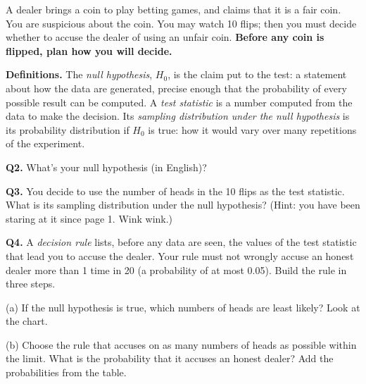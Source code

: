 \documentclass[11pt]{article}
\newif\ifsolutions
\newcommand{\answerbox}[2][2.2cm]{%
  \par\smallskip\noindent
  \begin{tcolorbox}[colback=white, colframe=gray!55, boxrule=0.4pt, sharp corners,
      height=#1, valign=top, left=5pt, right=5pt, top=3pt, bottom=3pt]
    \ifsolutions{\small\color{darkblue}#2}\fi
  \end{tcolorbox}\par}
\newcommand{\question}[1]{\par\medskip\noindent\textbf{#1}\enspace}
\begin{document}
\medskip
\begin{highlightbox}
A dealer brings a coin to play betting games, and claims that it is a fair coin.
You are suspicious about the coin.
You may watch 10 flips; then you must decide whether to accuse the dealer of using an unfair coin.
\textbf{Before any coin is flipped, plan how you will decide.}
\end{highlightbox}

\newpage
\begin{highlightbox}
\textbf{Definitions.}
The \emph{null hypothesis}, $H_0$, is the claim put to the test:
a statement about how the data are generated,
precise enough that the probability of every possible result can be computed.
A \emph{test statistic} is a number computed from the data to make the decision.
Its \emph{sampling distribution under the null hypothesis} is its probability distribution if $H_0$ is true:
how it would vary over many repetitions of the experiment.
\end{highlightbox}

\question{Q2.}
What's your null hypothesis (in English)?
\answerbox[1.1cm]{The coin is fair: each flip lands heads with probability 1/2, independently of the other flips.
(``The coin is unfair'' cannot be $H_0$: it does not fix the probability of any result.)}

\question{Q3.}
You decide to use the number of heads in the 10 flips as the test statistic.
What is its sampling distribution under the null hypothesis?
(Hint: you have been staring at it since page 1. Wink wink.)
\answerbox[0.9cm]{The binomial distribution with $n = 10$ and $p = 1/2$: the chart and table on page 1.}

\question{Q4.}
A \emph{decision rule} lists, before any data are seen,
the values of the test statistic that lead you to accuse the dealer.
Your rule must not wrongly accuse an honest dealer more than 1 time in 20 (a probability of at most 0.05).
Build the rule in three steps.

(a) If the null hypothesis is true, which numbers of heads are least likely? Look at the chart.
\answerbox[0.9cm]{0 and 10 heads (0.001 each), then 1 and 9 (0.010 each), then 2 and 8 (0.044 each).}

(b) Choose the rule that accuses on as many numbers of heads as possible within the limit.
What is the probability that it accuses an honest dealer? Add the probabilities from the table.
\answerbox[1.3cm]{Accuse on 0, 1, 9, or 10 heads: $0.001 + 0.010 + 0.010 + 0.001 = 0.022$.
Adding 2 and 8 makes $0.055 + 0.055 = 0.110$, over the limit.}
\end{document}
